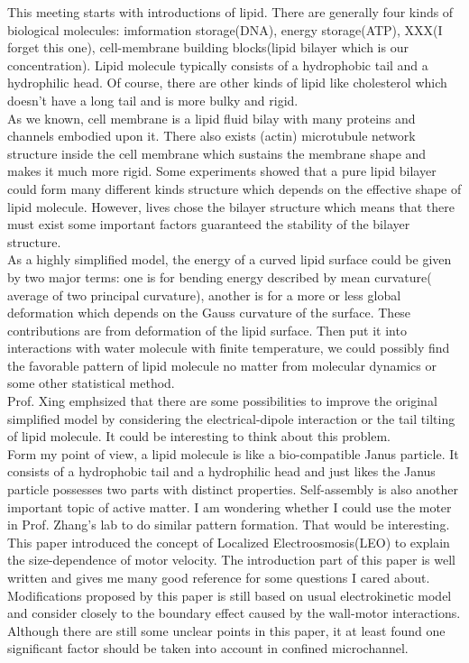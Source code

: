 \documentclass[fontsize=11pt, %
                             paper=a4, %
                             twoside, %
                             captions=tableheading,
                             index=totoc,
                             hyperref]{labbook}
\begin{document}
\begin{addmargin}[4cm]{0cm}
This meeting starts with introductions of lipid. There are generally four kinds of biological molecules: imformation storage(DNA), energy storage(ATP), XXX(I forget this one), cell-membrane building blocks(lipid bilayer which is our concentration). Lipid molecule typically consists of a hydrophobic tail and a hydrophilic head. Of course, there are other kinds of lipid like cholesterol which doesn't have a long tail and is more bulky and rigid. \\
As we known, cell membrane is a lipid fluid bilay with many proteins and channels embodied upon it. There also exists (actin) microtubule network structure inside the cell membrane which sustains the membrane shape and makes it much more rigid. Some experiments showed that a pure lipid bilayer could form many different kinds structure which depends on the effective shape of lipid molecule. However, lives chose the bilayer structure which means that there must exist some important factors guaranteed the stability of the bilayer structure.\\
As a highly simplified model, the energy of a curved lipid surface could be given by two major terms: one is for bending energy described by mean curvature( average of two principal curvature), another is for a more or less global deformation which depends on the Gauss curvature of the surface. These contributions are from deformation of the lipid surface. Then put it into interactions with water molecule with finite temperature, we could possibly find the favorable pattern of lipid molecule no matter from molecular dynamics or some other statistical method. \\
Prof. Xing emphsized that there are some possibilities to improve the original simplified model by considering the electrical-dipole interaction or the tail tilting of lipid molecule. It could be interesting to think about this problem.\\
Form my point of view, a lipid molecule is like a bio-compatible Janus particle. It consists of a hydrophobic tail and a hydrophilic head and just likes the Janus particle possesses two parts with distinct properties. Self-assembly is also another important topic of active matter. I am wondering whether I could use the moter in Prof. Zhang's lab to do similar pattern formation. That would be interesting.
This paper introduced the concept of Localized Electroosmosis(LEO) to explain the size-dependence of motor velocity. The introduction part of this paper is well written and gives me many good reference for some questions I cared about. Modifications proposed by this paper is still based on usual electrokinetic model and consider closely to the boundary effect caused by the wall-motor interactions. Although there are still some unclear points in this paper, it at least found one significant factor should be taken into account in confined microchannel. \\

\end{addmargin}
\end{document}
